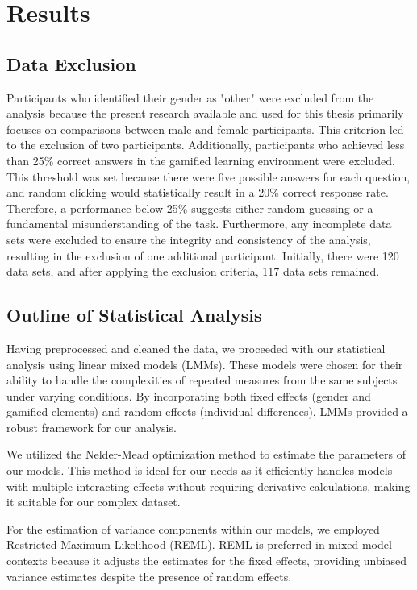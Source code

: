 
\section{Results}
\label{chap:evaluation}
\subsection{Data Exclusion}
Participants who identified their gender as "other" were excluded from the analysis because the present research available and used for this thesis primarily focuses on comparisons between male and female participants.
This criterion led to the exclusion of two participants. Additionally, participants who achieved less than 25\% correct answers in the gamified learning environment were excluded.
This threshold was set because there were five possible answers for each question, and random clicking would statistically result in a 20\% correct response rate.
Therefore, a performance below 25\% suggests either random guessing or a fundamental misunderstanding of the task.
Furthermore, any incomplete data sets were excluded to ensure the integrity and consistency of the analysis, resulting in the exclusion of one additional participant.
Initially, there were 120 data sets, and after applying the exclusion criteria, 117 data sets remained.

\subsection{Outline of Statistical Analysis}
Having preprocessed and cleaned the data, we proceeded with our statistical analysis using linear mixed models (LMMs).
These models were chosen for their ability to handle the complexities of repeated measures from the same subjects under varying conditions.
By incorporating both fixed effects (gender and gamified elements) and random effects (individual differences), LMMs provided a robust framework for our analysis.

We utilized the Nelder-Mead optimization method to estimate the parameters of our models.
This method is ideal for our needs as it efficiently handles models with multiple interacting effects without requiring derivative calculations, making it suitable for our complex dataset.

For the estimation of variance components within our models, we employed Restricted Maximum Likelihood (REML).
REML is preferred in mixed model contexts because it adjusts the estimates for the fixed effects, providing unbiased variance estimates despite the presence of random effects.

